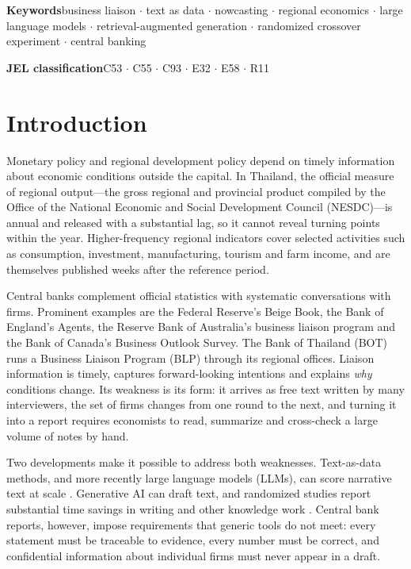 \documentclass[11pt]{article}
\begin{document}
\textbf{Keywords}\quad business liaison $\cdot$ text as data $\cdot$ nowcasting $\cdot$ regional economics $\cdot$ large language models $\cdot$ retrieval-augmented generation $\cdot$ randomized crossover experiment $\cdot$ central banking

\textbf{JEL classification}\quad C53 $\cdot$ C55 $\cdot$ C93 $\cdot$ E32 $\cdot$ E58 $\cdot$ R11

\newpage
\setcounter{tocdepth}{2}
{\small\setlength{\parskip}{0pt}\tableofcontents}
\newpage

\section{Introduction}\label{sec:intro}

Monetary policy and regional development policy depend on timely information about economic conditions outside the capital. In Thailand, the official measure of regional output---the gross regional and provincial product compiled by the Office of the National Economic and Social Development Council (NESDC)---is annual and released with a substantial lag, so it cannot reveal turning points within the year. Higher-frequency regional indicators cover selected activities such as consumption, investment, manufacturing, tourism and farm income, and are themselves published weeks after the reference period.

Central banks complement official statistics with systematic conversations with firms. Prominent examples are the Federal Reserve's Beige Book, the Bank of England's Agents, the Reserve Bank of Australia's business liaison program and the Bank of Canada's Business Outlook Survey. The Bank of Thailand (BOT) runs a Business Liaison Program (BLP) through its regional offices. Liaison information is timely, captures forward-looking intentions and explains \emph{why} conditions change. Its weakness is its form: it arrives as free text written by many interviewers, the set of firms changes from one round to the next, and turning it into a report requires economists to read, summarize and cross-check a large volume of notes by hand.

Two developments make it possible to address both weaknesses. Text-as-data methods, and more recently large language models (LLMs), can score narrative text at scale \citep{gentzkow2019text,hansen2023fedspeak}. Generative AI can draft text, and randomized studies report substantial time savings in writing and other knowledge work \citep{noy2023experimental,dellacqua2023jagged,brynjolfsson2025genai}. Central bank reports, however, impose requirements that generic tools do not meet: every statement must be traceable to evidence, every number must be correct, and confidential information about individual firms must never appear in a draft.
\end{document}
